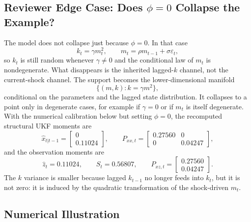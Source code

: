 \subsection{Reviewer Edge Case: Does \texorpdfstring{$\phi=0$}{phi = 0} Collapse the Example?}
\label{subsec:bf-phi-zero-collapse}

The model does not collapse just because $\phi=0$.  In that case
\[
  k_t=\gamma m_t^2,
  \qquad
  m_t=\rho m_{t-1}+\sigma\varepsilon_t,
\]
so $k_t$ is still random whenever $\gamma\neq0$ and the conditional law of
$m_t$ is nondegenerate.  What disappears is the inherited lagged-$k$ channel,
not the current-shock channel.  The support becomes the lower-dimensional
manifold
\[
  \{(m,k): k=\gamma m^2\},
\]
conditional on the parameters and the lagged state distribution.  It collapses
to a point only in degenerate cases, for example if $\gamma=0$ or if $m_t$ is
itself degenerate.  With the numerical calibration below but setting $\phi=0$,
the recomputed structural UKF moments are
\[
  \hat x_{t|t-1}
  =
  \begin{bmatrix}
    0\\0.11024
  \end{bmatrix},
  \qquad
  P_{xx,t}
  =
  \begin{bmatrix}
    0.27560 & 0\\
    0 & 0.04247
  \end{bmatrix},
\]
and the observation moments are
\[
  \hat z_t=0.11024,
  \qquad
  S_t=0.56807,
  \qquad
  P_{xz,t}=
  \begin{bmatrix}
    0.27560\\0.04247
  \end{bmatrix}.
\]
The $k$ variance is smaller because lagged $k_{t-1}$ no longer feeds into
$k_t$, but it is not zero: it is induced by the quadratic transformation of the
shock-driven $m_t$.

\subsection{Numerical Illustration}
\label{sec:bf-structural-ukf-numeric}

